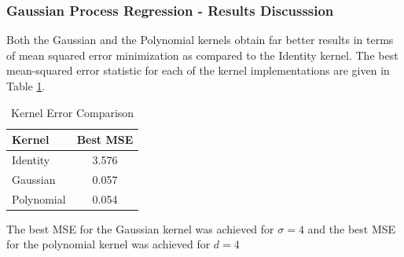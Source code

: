 \documentclass[parskip=full]{scrartcl}
\begin{document}

        \subsubsection*{Gaussian Process Regression - Results Discusssion} %
        \label{ssub:gaussian_process_regression_results_discusssion}

            Both the Gaussian and the Polynomial kernels obtain far better results in terms of mean squared error minimization as compared to the Identity kernel. The best mean-squared error statistic for each of the kernel implementations are given in Table \ref{tab:kernel_error_comparison}.

            \begin{table}[ht]
                \centering
                \begin{tabular}{| l | c |}
                \hline
                \textbf{Kernel} & \textbf{Best MSE} \\
                \hline
                \hline
                    Identity & 3.576 \\
                \hline
                    Gaussian & 0.057 \\
                \hline
                    Polynomial & 0.054 \\
                \hline
                \end{tabular}
                \caption{Kernel Error Comparison}
                \label{tab:kernel_error_comparison}
            \end{table}
            The best MSE for the Gaussian kernel was achieved for $\sigma = 4$ and the best MSE for the polynomial kernel was achieved for $d = 4$
\end{document}
